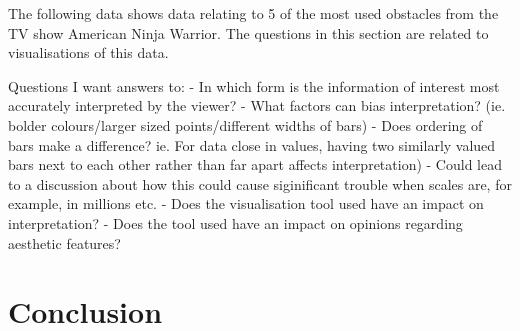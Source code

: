
The following data shows data relating to 5 of the most used obstacles from the TV show American Ninja Warrior. The questions
in this section are related to visualisations of this data.

Questions I want answers to:
- In which form is the information of interest most accurately interpreted by the viewer?
- What factors can bias interpretation? (ie. bolder colours/larger sized points/different widths of bars)
- Does ordering of bars make a difference? ie. For data close in values, having two similarly valued bars next to each other
  rather than far apart affects interpretation)
      - Could lead to a discussion about how this could cause siginificant trouble when scales are, for example, in millions etc.
- Does the visualisation tool used have an impact on interpretation?
- Does the tool used have an impact on opinions regarding aesthetic features?



\section{Conclusion}
